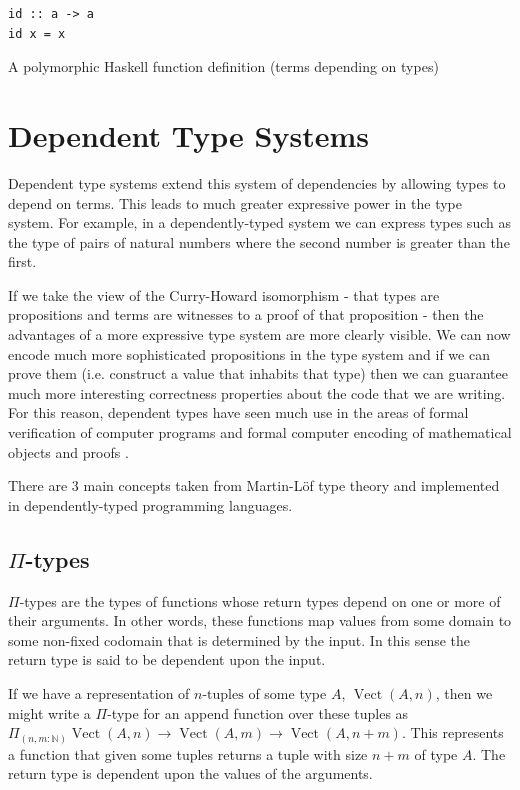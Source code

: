 \documentclass[a4paper, notitlepage]{report}
\begin{document}
\begin{listing}[H]
\begin{verbatim}
id :: a -> a
id x = x
\end{verbatim}
\caption{A polymorphic Haskell function definition (terms depending on types)}
\end{listing}

\section{Dependent Type Systems}
\label{sec:org3a3dcfe}
Dependent type systems extend this system of dependencies by allowing types to
depend on terms. This leads to much greater expressive power in the type system.
For example, in a dependently-typed system we can express types such as the type
of pairs of natural numbers where the second number is greater than the first.

If we take the view of the Curry-Howard isomorphism - that types are
propositions and terms are witnesses to a proof of that proposition - then the
advantages of a more expressive type system are more clearly visible. We can now
encode much more sophisticated propositions in the type system and if we can
prove them (i.e. construct a value that inhabits that type) then we can
guarantee much more interesting correctness properties about the code that we
are writing. For this reason, dependent types have seen much use in the areas of
formal verification of computer programs and formal computer encoding of
mathematical objects and proofs \cite{gonthier_formal_2008,leroy_compiler_2009}.

There are 3 main concepts taken from Martin-Löf type theory and implemented in
dependently-typed programming languages.

\subsection{\texorpdfstring{$\Pi$}{Pi}-types}
\label{sec:org69e5928}
\(\Pi\)-types are the types of functions whose return types depend on one or more of
their arguments. In other words, these functions map values from some domain to
some non-fixed codomain that is determined by the input. In this sense the
return type is said to be dependent upon the input.

If we have a representation of \(n\textrm{-tuples}\) of some type \(A\),
\(\operatorname{Vect}(A,n)\), then we might write a \(\Pi\)-type for an append
function over these tuples as \(\Pi_{(n, m \mathbin{:} {\mathbb N})}
\operatorname{Vect}(A,n) \rightarrow \operatorname{Vect}(A,m) \rightarrow
\operatorname{Vect}(A,n\mathbin{+}m)\). This represents a function that given
some tuples returns a tuple with size \(n\mathbin{+}m\) of type \(A\). The return
type is dependent upon the values of the arguments.
\end{document}
